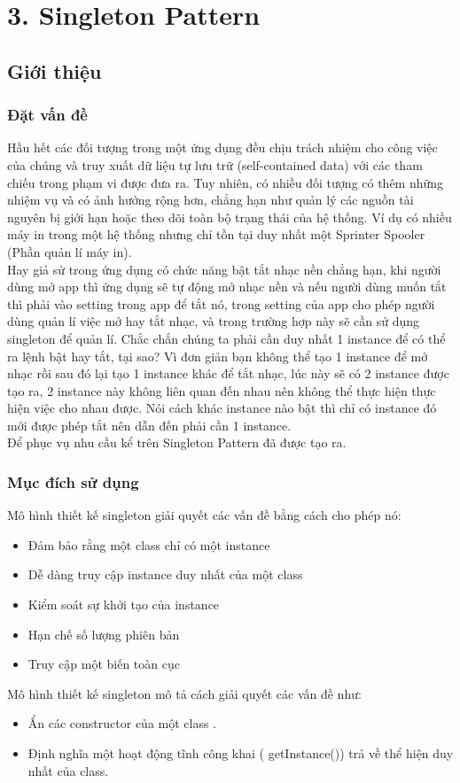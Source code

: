 \chapter{3. Singleton Pattern}

\section{Giới thiệu}
\subsection{Đặt vấn đề}
Hầu hết các đối tượng trong một ứng dụng đều chịu trách nhiệm cho công việc của chúng và truy xuất dữ liệu tự lưu trữ (self-contained data) với các tham chiếu trong phạm vi được đưa ra. Tuy nhiên, có nhiều đối tượng có thêm những nhiệm vụ và có ảnh hưởng rộng hơn, chẳng hạn như quản lý các nguồn tài nguyên bị giới hạn hoặc theo dõi toàn bộ trạng thái của hệ thống. Ví dụ có nhiều máy in trong một hệ thống nhưng chỉ tồn tại duy nhất một Sprinter Spooler (Phần quản lí máy in).\\
Hay giả sử trong ứng dụng có chức năng bật tắt nhạc nền chẳng hạn, khi người dùng mở app thì ứng dụng sẽ tự động mở nhạc nền và nếu người dùng muốn tắt thì phải vào setting trong app để tắt nó, trong setting của app cho phép người dùng quản lí việc mở hay tắt nhạc, và trong trường hợp này sẽ cần sử dụng singleton để quản lí. Chắc chắn chúng ta phải cần duy nhất 1 instance để có thể ra lệnh bật hay tắt, tại sao? Vì đơn giản bạn không thể tạo 1 instance để mở nhạc rồi sau đó lại tạo 1 instance khác để tắt nhạc, lúc này sẽ có 2 instance được tạo ra, 2 instance này không liên quan đến nhau nên không thể thực hiện thực hiện việc cho nhau được. Nói cách khác instance nào bật thì chỉ có instance đó mới được phép tắt nên dẫn đến phải cần 1 instance.\\
Để phục vụ nhu cầu kể trên Singleton Pattern đã được tạo ra.
\subsection{Mục đích sử dụng}
Mô hình thiết kế singleton giải quyết các vấn đề bằng cách cho phép nó:
\begin{itemize}
    \item Đảm bảo rằng một class chỉ có một instance
    \item Dễ dàng truy cập instance duy nhất của một class
    \item Kiểm soát sự khởi tạo của instance
    \item Hạn chế số lượng phiên bản
    \item Truy cập một biến toàn cục
\end{itemize}
Mô hình thiết kế singleton mô tả cách giải quyết các vấn đề như:
\begin{itemize}
    \item Ẩn các constructor của một class .
    \item Định nghĩa một hoạt động tĩnh công khai ( getInstance()) trả về thể hiện duy nhất của class.
\end{itemize}

